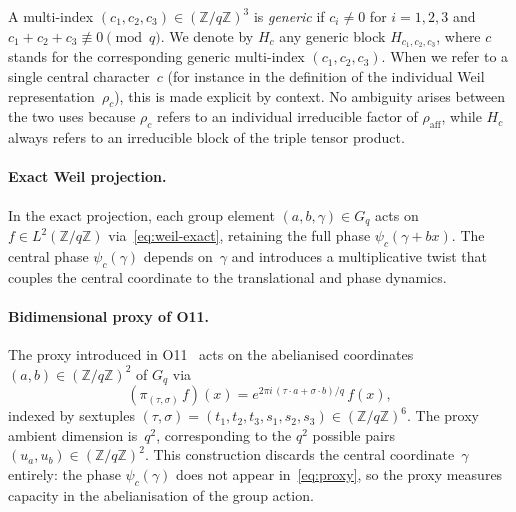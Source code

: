     \begin{definition}
      \label{def:generic}
      A multi-index $(c_1,c_2,c_3)\in(\mathbb{Z}/q\mathbb{Z})^3$ is \emph{generic} if
      $c_i\neq 0$ for $i=1,2,3$ and $c_1+c_2+c_3\not\equiv 0\pmod{q}$.
      We denote by $H_c$ any generic block $H_{c_1,c_2,c_3}$, where $c$ stands
      for the corresponding generic multi-index $(c_1,c_2,c_3)$.
      When we refer to a single central character~$c$ (for instance in the definition
      of the individual Weil representation~$\rho_c$), this is made explicit by context.
      No ambiguity arises between the two uses because $\rho_c$ refers to an individual
      irreducible factor of $\rho_{\mathrm{aff}}$, while $H_c$ always refers to an
      irreducible block of the triple tensor product.
    \end{definition}

    \paragraph{Exact Weil projection.}
      In the exact projection, each group element $(a,b,\gamma)\in G_q$ acts on
      $f\in L^2(\mathbb{Z}/q\mathbb{Z})$ via~\eqref{eq:weil-exact}, retaining the
      full phase $\psi_c(\gamma+bx)$.
      The central phase $\psi_c(\gamma)$ depends on~$\gamma$ and introduces
      a multiplicative twist that couples the central coordinate to the translational
      and phase dynamics.

    \paragraph{Bidimensional proxy of O11.}
      The proxy introduced in O11~\cite{Beau2026a15} acts on the abelianised
      coordinates $(a,b)\in(\mathbb{Z}/q\mathbb{Z})^2$ of $G_q$ via
    \begin{equation}
      (\pi_{(\tau,\sigma)}\,f)(x) = e^{2\pi i\,(\tau\cdot a + \sigma\cdot b)/q}\,f(x),
      \label{eq:proxy}
      \end{equation}
      indexed by sextuples $(\tau,\sigma)=(t_1,t_2,t_3,s_1,s_2,s_3)\in(\mathbb{Z}/q\mathbb{Z})^6$.
      The proxy ambient dimension is~$q^2$, corresponding to the $q^2$ possible pairs
      $(u_a,u_b)\in(\mathbb{Z}/q\mathbb{Z})^2$.
      This construction discards the central coordinate~$\gamma$ entirely:
      the phase $\psi_c(\gamma)$ does not appear in~\eqref{eq:proxy},
      so the proxy measures capacity in the abelianisation of the group action.

